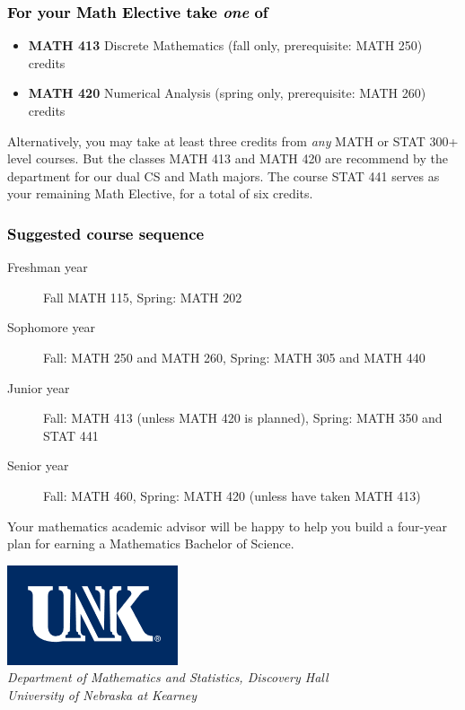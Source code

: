 \documentclass[10pt]{article}
\newenvironment{mypar}[2]
   {\begin{list}{}%
     {\setlength\leftmargin{#1}
     \setlength\rightmargin{#2}}
     \item[]}
   {\end{list}}
\newcommand{\discrete}{\textbf{MATH 413} Discrete Mathematics  (fall only, prerequisite: MATH 250)\dotfill 3 credits}
\newcommand{\numerical}{\textbf{MATH 420}   Numerical Analysis   (spring only, prerequisite: MATH 260)\dotfill 3 credits}
\begin{document}
\subsubsection*{\textcolor{black}{For your  Math Elective take \emph{one} of}}
\begin{itemize}
\item \discrete
\item \numerical
\end{itemize}
\begin{mypar}{0.5cm}{0.5cm}  Alternatively, you may take at least three credits from \emph{any} MATH or STAT 300+ level courses. But the classes MATH 413 and MATH 420 are recommend by the department for our
dual CS and Math majors.  The course STAT 441 serves as your remaining Math Elective, for a total of six credits. \end{mypar}


\begin{center} \fbox{
  {\textcolor{unkblue}{For a suggested course sequence, see the next page.}}}
\end{center}
\subsubsection*{\textcolor{black}{Suggested course sequence}}

\begin{description}
   \item[\phantom{xxx} Freshman year] Fall MATH 115, Spring: MATH 202
      \item[\phantom{xxx} Sophomore year]  Fall: MATH 250 and MATH 260,   Spring: MATH 305 and MATH 440
     \item[\phantom{xxx} Junior year]  Fall: MATH 413 (unless MATH 420 is planned),  Spring: MATH 350 and STAT 441
      \item[\phantom{xxx} Senior year]  Fall: MATH 460,  Spring: MATH 420 (unless have taken MATH 413)
 \end{description}

\begin{mypar}{0.5cm}{0.5cm}  Your mathematics academic advisor will be happy to help you build a four-year plan for earning a Mathematics Bachelor of Science.

\end{mypar}
\newpage



\begin{flushleft}
\includegraphics[scale=0.25]{unk-logo}\\
 \emph{\textcolor{unkblue}{Department of Mathematics and Statistics, Discovery Hall}} \\
  \emph{\textcolor{unkblue}{University of Nebraska at Kearney}}
\end{flushleft}
\end{document}

